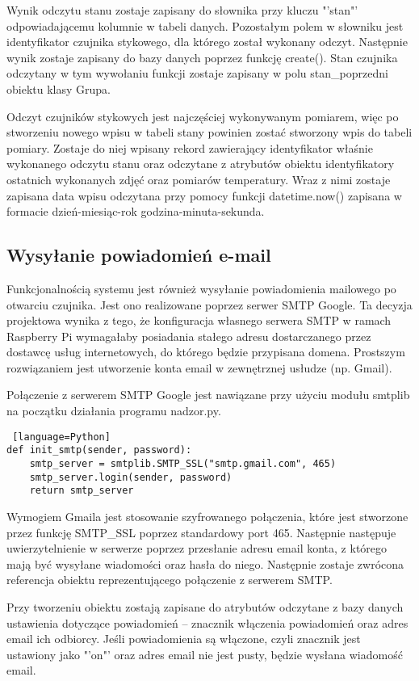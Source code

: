\documentclass[a4paper,12pt,twoside]{article}
\begin{document}
Wynik odczytu stanu zostaje zapisany do słownika przy kluczu "'stan"' odpowiadającemu kolumnie w tabeli danych. Pozostałym polem w słowniku jest identyfikator czujnika stykowego, dla którego został wykonany odczyt. Następnie wynik zostaje zapisany do bazy danych poprzez funkcję create(). Stan czujnika odczytany w tym wywołaniu funkcji zostaje zapisany w polu stan{\_}poprzedni obiektu klasy Grupa. 

Odczyt czujników stykowych jest najczęściej wykonywanym pomiarem, więc po stworzeniu nowego wpisu w tabeli stany powinien zostać stworzony wpis do tabeli pomiary. Zostaje do niej wpisany rekord zawierający identyfikator właśnie wykonanego odczytu stanu oraz odczytane z atrybutów obiektu identyfikatory ostatnich wykonanych zdjęć oraz pomiarów temperatury. Wraz z nimi zostaje zapisana data wpisu odczytana przy pomocy funkcji datetime.now() zapisana w formacie dzień-miesiąc-rok godzina-minuta-sekunda.

\subsection{Wysyłanie powiadomień e-mail}
Funkcjonalnością systemu jest również wysyłanie powiadomienia mailowego po otwarciu czujnika. Jest ono realizowane poprzez serwer SMTP Google. Ta decyzja projektowa wynika z tego, że konfiguracja własnego serwera SMTP w ramach Raspberry Pi wymagałaby posiadania stałego adresu dostarczanego przez dostawcę usług internetowych, do którego będzie przypisana domena. Prostszym rozwiązaniem jest utworzenie konta email w zewnętrznej usłudze (np. Gmail). 

Połączenie z serwerem SMTP Google jest nawiązane przy użyciu modułu smtplib na początku działania programu nadzor.py. 
\begin{lstlisting} [language=Python]
def init_smtp(sender, password):
    smtp_server = smtplib.SMTP_SSL("smtp.gmail.com", 465)
    smtp_server.login(sender, password)
    return smtp_server 
\end{lstlisting}
Wymogiem Gmaila jest stosowanie szyfrowanego połączenia, które jest stworzone przez funkcję SMTP{\_}SSL poprzez standardowy port 465. Następnie następuje uwierzytelnienie w serwerze poprzez przesłanie adresu email konta, z którego mają być wysyłane wiadomości oraz hasła do niego. Następnie zostaje zwrócona referencja obiektu reprezentującego połączenie z serwerem SMTP.

Przy tworzeniu obiektu zostają zapisane do atrybutów odczytane z bazy danych ustawienia dotyczące powiadomień -- znacznik włączenia powiadomień oraz adres email ich odbiorcy. Jeśli powiadomienia są włączone, czyli znacznik jest ustawiony jako "'on"' oraz adres email nie jest pusty, będzie wysłana wiadomość email.
\end{document}

